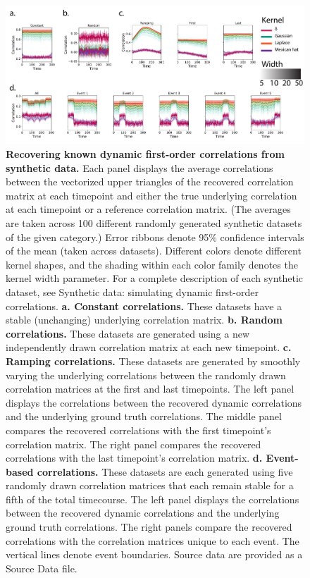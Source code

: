 \documentclass[english]{article}
\begin{document}
\begin{figure}[tp]
  \centering
  \includegraphics[width=\textwidth]{figs/synthetic_data}
  \caption{\textbf{Recovering known dynamic first-order correlations
       from synthetic data.} Each panel displays the average
    correlations between the vectorized upper triangles of the
    recovered correlation matrix at each timepoint and either the true
    underlying correlation at each timepoint or a reference
    correlation matrix.  (The averages are taken across 100 different
    randomly generated synthetic datasets of the given category.)
    Error ribbons denote 95\% confidence intervals of the mean (taken across
    datasets). Different colors denote different kernel shapes, and
    the shading within each color family denotes the kernel width
    parameter.  For a complete description of each synthetic dataset,
    see Synthetic data: simulating dynamic first-order
      correlations. \textbf{a. Constant correlations.}  These
    datasets have a stable (unchanging) underlying correlation matrix.
  \textbf{b. Random correlations.}  These datasets are generated
    using a new independently drawn correlation matrix at each new
    timepoint. \textbf{c. Ramping correlations.} These datasets are
    generated by smoothly varying the underlying correlations between
    the randomly drawn correlation matrices at the first and last
    timepoints.  The left panel displays the correlations between the
    recovered dynamic correlations and the underlying ground truth
    correlations.  The middle panel compares the recovered
    correlations with the first timepoint's correlation
    matrix.  The right panel compares the recovered correlations with
    the last timepoint's correlation matrix.
  \textbf{d. Event-based correlations.} These datasets are each
    generated using five randomly drawn correlation matrices that each
    remain stable for a fifth of the total timecourse.  The left panel
    displays the correlations between the recovered dynamic
    correlations and the underlying ground truth correlations.  The
    right panels compare the recovered correlations with the
    correlation matrices unique to each event.  The vertical lines
    denote event boundaries. Source data are provided as a Source Data file.}
  \label{fig:synthetic}
\end{figure}
\end{document}
